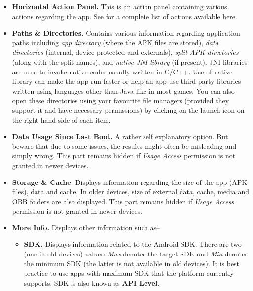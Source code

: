 \begin{itemize}
    \item \textbf{Horizontal Action Panel.} This is an action panel containing various actions regarding the app. See
     for a complete list of actions available here.

    \item \textbf{Paths \& Directories.} Contains various information regarding application paths including \textit{app
    directory} (where the APK files are stored), \textit{data directories} (internal, device protected and externals),
    \textit{split APK directories} (along with the split names), and \textit{native JNI library} (if present). JNI
    libraries are used to invoke native codes usually written in C/C++. Use of native library can make the app run
    faster or help an app use third-party libraries written using languages other than Java like in most games. You can
    also open these directories using your favourite file managers (provided they support it and have necessary
    permissions) by clicking on the launch icon on the right-hand side of each item.

    \item \textbf{Data Usage Since Last Boot.} A rather self explanatory option. But beware that due to some issues, the
    results might often be misleading and simply wrong. This part remains hidden if \textit{Usage Access} permission is
    not granted in newer devices.

    \item \textbf{Storage \& Cache.} Displays information regarding the size of the app (APK files), data and cache. In
    older devices, size of external data, cache, media and OBB folders are also displayed. This part remains hidden if
    \textit{Usage Access} permission is not granted in newer devices.

    \item \textbf{More Info.} Displays other information such as--
    \begin{itemize}
        \item \textbf{SDK.} Displays information related to the Android SDK. There are two (one in old devices) values:
        \textit{Max} denotes the target SDK and \textit{Min} denotes the minimum SDK (the latter is not available in old
        devices). It is best practice to use apps with maximum SDK that the platform currently supports. SDK is also
        known as \textbf{API Level}.


\end{itemize}
\end{itemize}
